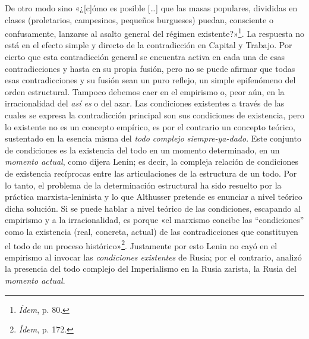 De otro modo sino «¿{[}c{]}ómo es posible {[}\ldots{]} que las masas populares, divididas en clases (proletarios, campesinos, pequeños burgueses) puedan, consciente o confusamente, lanzarse al asalto general del régimen existente?»\footnote{\emph{Ídem}, p. 80.}. La respuesta no está en el efecto simple y directo de la contradicción en Capital y Trabajo. Por cierto que esta contradicción general se encuentra activa en cada una de esas contradicciones y hasta en su propia fusión, pero no se puede afirmar que todas esas contradicciones y su fusión sean un puro reflejo, un simple epifenómeno del orden estructural. Tampoco debemos caer en el empirismo o, peor aún, en la irracionalidad del \emph{así es} o del azar. Las condiciones existentes a través de las cuales se expresa la contradicción principal son sus condiciones de existencia, pero lo existente no es un concepto empírico, es por el contrario un concepto teórico, sustentado en la esencia misma del \emph{todo complejo siempre-ya-dado}. Este conjunto de condiciones es la existencia del todo en un momento determinado, en un \emph{momento actual}, como dijera Lenin; es decir, la compleja relación de condiciones de existencia recíprocas entre las articulaciones de la estructura de un todo. Por lo tanto, el problema de la determinación estructural ha sido resuelto por la práctica marxista-leninista y lo que Althusser pretende es enunciar a nivel teórico dicha solución. Si se puede hablar a nivel teórico de las condiciones, escapando al empirismo y a la irracionalidad, es porque «el marxismo concibe las ``condiciones'' como la existencia (real, concreta, actual) de las contradicciones que constituyen el todo de un proceso histórico»\footnote{\emph{Ídem}, p. 172.}. Justamente por esto Lenin no cayó en el empirismo al invocar las \emph{condiciones existentes} de Rusia; por el contrario, analizó la presencia del todo complejo del Imperialismo en la Rusia zarista, la Rusia del \emph{momento actual}.


